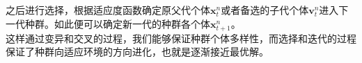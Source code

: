 \documentclass[11pt,a4paper]{article}
\begin{document}
之后进行选择，根据适应度函数确定原父代个体$\mathbf{x}^n_{t}$或者备选的子代个体$\mathbf{v}^n_{t}$进入下一代种群。如此便可以确定新一代的种群各个体$\mathbf{x}^n_{t+1}$。\\

这样通过变异和交叉的过程，我们能够保证种群个体多样性，而选择和迭代的过程保证了种群向适应环境的方向进化，也就是逐渐接近最优解。








\newpage
\printbibliography[title=参考文献]
\end{document}
